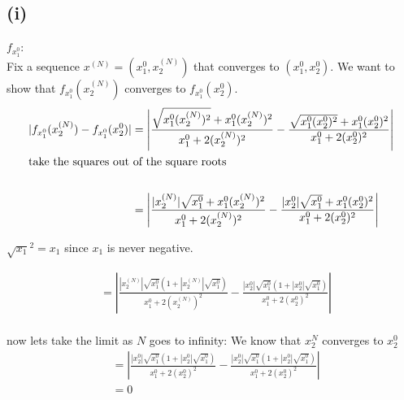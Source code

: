 \documentclass{article}
\begin{document}
\subsection*{(i)}
\(f_{x_1^0}\): \\
Fix a sequence \(x^{(N)} = (x_1^0, x_2^{(N)})\) that converges to \((x_1^0, x_2^0)\).
We want to show that \(f_{x_1^0}(x_2^{(N)})\) converges to \(f_{x_1^0}(x_2^0)\).
\begin{align*}
   |f_{x_1^0}(x_2^{(N)}) - f_{x_1^0}(x_2^0)| &= \left|\frac{\sqrt{x_1^0 (x_2^{(N)})^2} + x_1^0 (x_2^{(N)})^2}{x_1^0 + 2(x_2^{(N)})^2} - \frac{\sqrt{x_1^0 (x_2^0)^2} + x_1^0 (x_2^0)^2}{x_1^0 + 2(x_2^0)^2}\right| \\
   \shortintertext{take the squares out of the square roots} \\
   &= \left|\frac{|x_2^{(N)}| \sqrt{x_1^0} + x_1^0 (x_2^{(N)})^2}{x_1^0 + 2(x_2^{(N)})^2} - \frac{|x_2^0| \sqrt{x_1^0} + x_1^0 (x_2^0)^2}{x_1^0 + 2(x_2^0)^2}\right| \\
\end{align*}

\(\sqrt{x_1}^2 = x_1\) since \(x_1\) is never negative.

\begin{align*}
   &= \left|\frac{|x_2^{(N)}| \sqrt{x_1^0} (1 + |x_2^{(N)}| \sqrt{x_1^0})}{x_1^0 + 2(x_2^{(N)})^2} - \frac{|x_2^0| \sqrt{x_1^0} (1 + |x_2^0| \sqrt{x_1^0})}{x_1^0 + 2(x_2^0)^2}\right| \\
\end{align*}

now lets take the limit as \(N\) goes to infinity:
We know that \(x_2^{N}\) converges to \(x_2^0\)
\begin{align*}
   &= \left|\frac{|x_2^0| \sqrt{x_1^0} (1 + |x_2^0| \sqrt{x_1^0})}{x_1^0 + 2(x_2^0)^2} - \frac{|x_2^0| \sqrt{x_1^0} (1 + |x_2^0| \sqrt{x_1^0})}{x_1^0 + 2(x_2^0)^2}\right| \\
   &= 0 \\
\end{align*}
\end{document}
